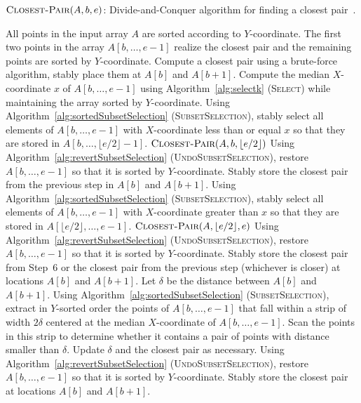 \documentclass{elsart}
\begin{document}
\begin{algorithm} \label{alg:nn}
  \caption{$\textsc{Closest-Pair}(A,b,e)$: Divide-and-Conquer algorithm for finding a closest
    pair~\cite{bentley:divide-and-conquer}.}\label{alg:bentley} 
  \begin{algorithmic}[1]
    \REQUIRE All points in the input array $A$ are sorted according to
    $Y$-coordinate.
    \ENSURE The first two points in the array $A[b,\ldots,e-1]$ realize the closest pair and the remaining points are sorted by $Y$-coordinate.
      \STATE Compute a closest pair using a brute-force
algorithm, stably place them at $A[b]$ and $A[b+1]$.
    \ELSE
      \STATE Compute the median $X$-coordinate $x$ of $A[b,\ldots,e-1]$ using
Algorithm~\ref{alg:selectk} (\textsc{Select}) while maintaining the array
sorted by $Y$-coordinate.
      \STATE Using Algorithm~\ref{alg:sortedSubsetSelection}
(\textsc{SubsetSelection}), stably select all
elements of $A[b,\ldots,e-1]$ with $X$-coordinate less than or equal $x$ so
that they are stored in $A[b,\ldots,\lfloor e/2\rfloor-1]$. 
      \STATE $\textsc{Closest-Pair}(A,b,\lfloor e/2 \rfloor)$
      \STATE Using Algorithm~\ref{alg:revertSubsetSelection}
(\textsc{UndoSubsetSelection}), restore
$A[b,\ldots,e-1]$ so that it is sorted by $Y$-coordinate.  Stably store the
closest pair from the previous step in $A[b]$ and $A[b+1]$.
       \STATE Using Algorithm~\ref{alg:sortedSubsetSelection}
(\textsc{SubsetSelection}), stably select all elements of $A[b,\ldots,e-1]$ with $X$-coordinate greater than $x$ so that they are stored in
$A[\lfloor e/2\rfloor,\ldots,e-1]$. 
      \STATE $\textsc{Closest-Pair}(A,\lfloor e/2 \rfloor,e)$
       \STATE Using Algorithm~\ref{alg:revertSubsetSelection}
(\textsc{UndoSubsetSelection}), restore
$A[b,\ldots,e-1]$ so that it is sorted by $Y$-coordinate.  Stably store the
closest pair from Step~6 or the closest pair from the previous step (whichever
is closer) at
locations $A[b]$ and $A[b+1]$.
      \STATE Let $\delta$ be the distance between $A[b]$ and $A[b+1]$.
      \STATE Using Algorithm~\ref{alg:sortedSubsetSelection}
(\textsc{SubsetSelection}), extract in $Y$-sorted order the points of $A[b,\ldots,e-1]$ that fall within a
                strip of width $2\delta$ centered at the median $X$-coordinate of $A[b,\ldots,e-1]$.
         \STATE Scan the points in this strip to determine whether it
contains a pair of
                points with distance smaller than $\delta$. Update $\delta$ and
                the closest pair as necessary. 
        \STATE Using Algorithm~\ref{alg:revertSubsetSelection}
(\textsc{UndoSubsetSelection}), restore
$A[b,\ldots,e-1]$ so that it is sorted by $Y$-coordinate.  Stably store the closest pair 
at
locations $A[b]$ and $A[b+1]$.
    \ENDIF
  \end{algorithmic}
\end{algorithm}
\end{document}
